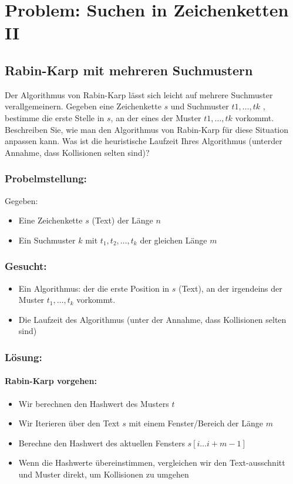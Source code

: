 \section{Problem: Suchen in Zeichenketten II}

\subsection{Rabin-Karp mit mehreren Suchmustern}\label{Rabin-Karp-suchmuster}
Der Algorithmus von Rabin-Karp lässt sich leicht auf mehrere Suchmuster
verallgemeinern. Gegeben eine Zeichenkette $s$ und Suchmuster $t1 , \dots , tk$ , bestimme die erste Stelle in $s$, an der eines der Muster $t1, \dots , tk$ vorkommt. Beschreiben Sie, wie man den Algorithmus von Rabin-Karp für diese Situation anpassen kann. Was ist die heuristische Laufzeit Ihres Algorithmus (unterder Annahme, dass Kollisionen selten sind)?

\subsubsection{Probelmstellung:}
Gegeben:
\begin{itemize}
	\item Eine Zeichenkette $s$ (Text) der Länge $n$
	\item Ein Suchmuster $k$ mit $t_1, t_2, \dots , t_k$ der gleichen Länge $m$
\end{itemize}

\subsubsection{Gesucht:}
\begin{itemize}
	\item Ein Algorithmus: der die erste Position in $s$ (Text), an der irgendeins der Muster $t_1, \dots, t_k$ vorkommt.
	\item Die Laufzeit des Algorithmus (unter der Annahme, dass Kollisionen selten sind)
\end{itemize}

\subsubsection{Lösung:}
\paragraph{Rabin-Karp vorgehen:}
\begin{itemize}
	\item Wir berechnen den Hashwert des Musters $t$
	\item Wir Iterieren über den Text $s$ mit einem Fenster/Bereich der Länge $m$
	\item Berechne den Hashwert des aktuellen Fensters $s[i \dots i+m-1]$
	\item Wenn die Hashwerte übereinstimmen, vergleichen wir den Text-ausschnitt und Muster direkt, um Kollisionen zu umgehen
\end{itemize}

